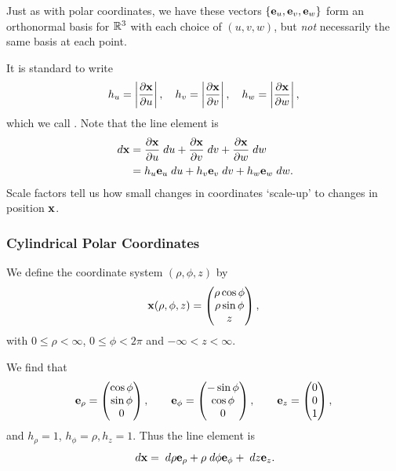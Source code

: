 \documentclass[a4paper]{scrartcl}
\begin{document}
Just as with polar coordinates, we have these vectors $\{\mathbf{e}_u, \mathbf{e}_v, \mathbf{e}_w\}$ form an orthonormal basis for $\mathbb{R}^3$ with each choice of $(u, v, w)$, but \emph{not} necessarily the same basis at each point.

It is standard to write
$$
h_u = \left|\frac{\partial \mathbf{x}}{\partial u}\right|,
\quad h_v = \left|\frac{\partial \mathbf{x}}{\partial v}\right|,
\quad h_w = \left|\frac{\partial \mathbf{x}}{\partial w}\right|,
$$
which we call . Note that the line element is
\begin{align*}
	\; d \mathbf{x} &= \frac{\partial \mathbf{x}}{\partial u} \; d u
	+ \frac{\partial \mathbf{x}}{\partial v} \; d v
	+ \frac{\partial \mathbf{x}}{\partial w} \; d w \\
	&= h_u \mathbf{e}_u \; d u  + h_v \mathbf{e}_v \; d v  + h_w \mathbf{e}_w \; d w.
\end{align*}
Scale factors tell us how small changes in coordinates `scale-up' to changes in position $\mathbf{x}$.

\subsubsection{Cylindrical Polar Coordinates}

We define the coordinate system $(\rho, \phi, z)$ by
$$
\mathbf{x}(\rho, \phi, z) = \begin{pmatrix}
	\rho \cos \phi \\
	\rho \sin \phi \\
	z
\end{pmatrix},
$$
with $0 \leq \rho < \infty$, $0 \leq \phi < 2 \pi$ and $- \infty < z < \infty$.

We find that
$$
\mathbf{e}_{\rho} = \begin{pmatrix}
	\cos \phi \\
	\sin \phi \\ 0
\end{pmatrix}, \quad \quad \mathbf{e}_{\phi} = \begin{pmatrix}
	-\sin \phi \\
	\cos \phi \\
	0
\end{pmatrix}, \quad \quad \mathbf{e}_z = \begin{pmatrix}
	0 \\ 0 \\ 1
\end{pmatrix},
$$
and $h_\rho = 1$, $h_{\phi} = \rho, h_z = 1$. Thus the line element is
$$
\; d \mathbf{x} = \; d \rho \mathbf{e}_\rho + \rho \; d \phi \mathbf{e}_\phi
 + \; d z \mathbf{e}_z.
 $$
\end{document}
